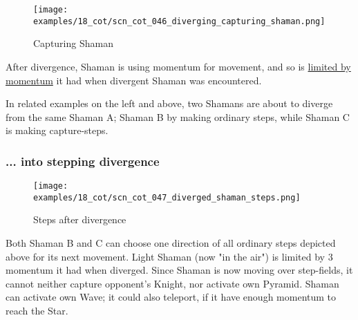 \noindent
\begin{wrapfigure}[11]{l}{0.4\textwidth}
\centering
\texttt{[image: examples/18\_cot/scn\_cot\_046\_diverging\_capturing\_shaman.png]}
\vspace*{-0.4\baselineskip}
\caption{Capturing Shaman}
\label{fig:scn_cot_046_diverging_capturing_shaman}
\end{wrapfigure}
After divergence, Shaman is using momentum for movement, and so is
\hyperref[fig:scn_cot_031_own_shaman_is_divergent_end]{limited by momentum} it had
when divergent Shaman was encountered.

In related examples on the left and above, two Shamans are about to diverge from the
same Shaman A; Shaman B by making ordinary steps, while Shaman C is making capture-steps.

\clearpage %

\subsubsection*{... into stepping divergence}
\label{sec:Conquest of Tlalocan/Divergence/... into stepping divergence}

\vspace*{-1.4\baselineskip}
\noindent
\begin{figure}[!h]
\texttt{[image: examples/18\_cot/scn\_cot\_047\_diverged\_shaman\_steps.png]}
\vspace*{-1.4\baselineskip}
\caption{Steps after divergence}
\label{fig:scn_cot_047_diverged_shaman_steps}
\end{figure}

\vspace*{-0.4\baselineskip}
Both Shaman B and C can choose one direction of all ordinary steps depicted above
for its next movement. Light Shaman (now "in the air") is limited by 3 momentum it
had when diverged.\newline
\indent
Since Shaman is now moving over step-fields, it cannot neither capture opponent's
Knight, nor activate own Pyramid. Shaman can activate own Wave; it could also
teleport, if it have enough momentum to reach the Star.

\clearpage %

